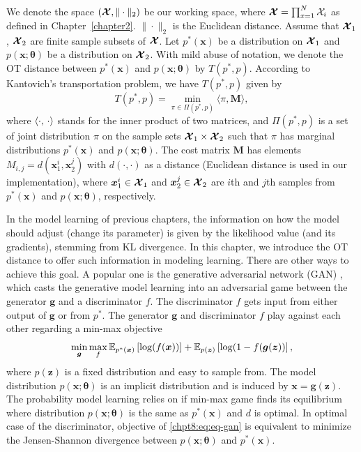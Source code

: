 We denote the space $(\bm{\mathcal{X}},\|\cdot\|_2)$ be our working space, where $\bm{\mathcal{X}} = \prod_{x=1}^{N} \mathcal{X}_i$ as defined in Chapter~\ref{chapter2}. $\|\cdot\|_2$ is the Euclidean distance. Assume that $\bm{\mathcal{X}}_1$, $\bm{\mathcal{X}}_2$ are finite sample subsets of $\bm{\mathcal{X}}$. Let $p^{\ast}(\bm{x})$ be a distribution on $\bm{\mathcal{X}}_1$ and $p(\bm{x};\bm{\theta})$ be a distribution on $\bm{\mathcal{X}}_2$.
With mild abuse of notation, we denote the OT distance between $p^{\ast}(\bm{x})$ and $p(\bm{x}; \bm{\theta})$ by $T(p^{\ast},p)$. According to Kantovich's transportation problem\cite{villani2003topics}, we have $T(p^{\ast},p)$ given by
\begin{equation}\label{chpt8:eq:ot}
  T(p^{\ast}, p) = \min_{\pi\in\Pi(p^{\ast}, p)}\langle\pi,\bm{M}\rangle,
\end{equation}
where $\langle \cdot,\,\cdot\rangle$ stands for the inner product of
two matrices, and $\Pi(p^{\ast},p)$ is a set of joint distribution $\pi$ on
the sample sets $\bm{\mathcal{X}}_1\times\bm{\mathcal{X}}_2$ such that $\pi$ has
marginal distributions $p^{\ast}(\bm{x})$ and $p(\bm{x}; \bm{\theta})$. 
The cost matrix $\bm{M}$ has elements $M_{i,j} = d(\bm{x}_1^{i}, \bm{x}_2^{j})$ with $d(\cdot, \cdot)$ as a distance (Euclidean distance is used in our implementation), where $\bm{x}_1^{i}\in\bm{\mathcal{X}}_1$ and $\bm{x}_2^{j}\in \bm{\mathcal{X}}_2$ are $i$th and $j$th samples from $p^{\ast}(\bm{x})$ and $p(\bm{x}; \bm{\theta})$, respectively. 


\begin{remark}
  In the model learning of previous chapters, the information on how the model should adjust (change its parameter) is given by the likelihood value (and its gradients), stemming from KL divergence. In this chapter, we introduce the OT distance to offer such information in modeling learning. There are other ways to achieve this goal. A popular one is the generative adversarial network (GAN) \cite{NIPS2014_5423, 2017arXiv170100160G}, which casts the generative model learning into an adversarial game between the generator $\bm{g}$ and a discriminator $f$.
The {discriminator} $f$ gets input from either output of $\bm{g}$ or from
$p^{\ast}$. The generator $\bm{g}$ and discriminator ${f}$ play against each other
regarding a min-max objective
\begin{equation}\label{chpt8:eq:eq-gan}
  \min_{\bm{g}} \max_f \mathbb{E}_{p^{\ast}(\bm{x})}\left[ \log(f(\bm{x})) \right] + \mathbb{E}_{p(\bm{z})}\left[ \log(1-f(\bm{g}(\bm{z})) \right],
\end{equation}
where $p(\bm{z})$ is a fixed distribution and easy to sample from. The model distribution $p(\bm{x}; \bm{\theta})$ is an implicit distribution and is induced by $\bm{x} = \bm{g}(\bm{z})$.
The probability model learning relies on if min-max game finds
its equilibrium where distribution $p(\bm{x}; \bm{\theta})$ is the same as $p^{\ast}(\bm{x})$ and
$d$ is optimal. In optimal case of the discriminator, objective of
\eqref{chpt8:eq:eq-gan} is equivalent to minimize the Jensen-Shannon divergence between $p(\bm{x}; \bm{\theta})$ and $p^{\ast}(\bm{x})$.
\end{remark}


